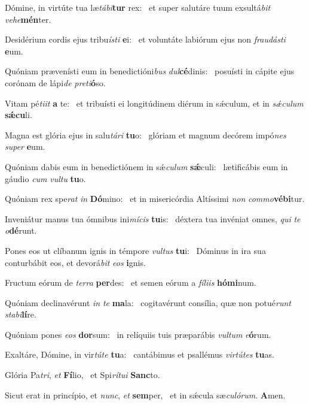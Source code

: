 \item Dómine, in virtúte tua læ\textit{tábi}\textbf{tur} rex:~\psstar{} et super salutáre tuum exsultá\textit{bit} \textit{vehe}\textbf{mén}ter.
\item Desidérium cordis ejus tribu\textit{ísti} \textbf{e}i:~\psstar{} et voluntáte labiórum ejus non \textit{fraudásti} \textbf{e}um.
\item Quóniam prævenísti eum in benedictióni\textit{bus} \textit{dul}\textbf{cé}dinis:~\psstar{} posuísti in cápite ejus corónam de lápi\textit{de} \textit{preti}\textbf{ó}so.
\item Vitam pé\textit{tiit} \textbf{a} te:~\psstar{} et tribuísti ei longitúdinem diérum in sǽculum, et in \textit{sǽculum} \textbf{sǽ}\textbf{cu}li.
\item Magna est glória ejus in salu\textit{tári} \textbf{tu}o:~\psstar{} glóriam et magnum decórem impó\textit{nes} \textit{super} \textbf{e}um.
\item Quóniam dabis eum in benedictiónem in sǽ\textit{culum} \textbf{sǽ}culi:~\psstar{} lætificábis eum in gáudio \textit{cum} \textit{vultu} \textbf{tu}o.
\item Quóniam rex spe\textit{rat} \textit{in} \textbf{Dó}mino:~\psstar{} et in misericórdia Altíssimi \textit{non} \textit{commo}\textbf{vé}\textbf{bi}tur.
\item Inveniátur manus tua ómnibus ini\textit{mícis} \textbf{tu}is:~\psstar{} déxtera tua invéniat omnes, \textit{qui} \textit{te} \textit{o}\textbf{dé}runt.
\item Pones eos ut clíbanum ignis in témpore \textit{vultus} \textbf{tu}i:~\psstar{} Dóminus in ira sua conturbábit eos, et devorá\textit{bit} \textit{eos} \textbf{i}gnis.
\item Fructum eórum de \textit{terra} \textbf{per}des:~\psstar{} et semen eórum a \textit{fíliis} \textbf{hó}\textbf{mi}num.
\item Quóniam declinavérunt \textit{in} \textit{te} \textbf{ma}la:~\psstar{} cogitavérunt consília, quæ non potué\textit{runt} \textit{stabi}\textbf{lí}re.
\item Quóniam pones \textit{eos} \textbf{dor}sum:~\psstar{} in relíquiis tuis præparábis \textit{vultum} \textit{e}\textbf{ó}rum.
\item Exaltáre, Dómine, in vir\textit{túte} \textbf{tu}a:~\psstar{} cantábimus et psallémus \textit{virtútes} \textbf{tu}as.
\item Glória Pa\textit{tri}, \textit{et} \textbf{Fí}lio,~\psstar{} et Spi\textit{rítui} \textbf{Sanc}to.
\item Sicut erat in princípio, et \textit{nunc}, \textit{et} \textbf{sem}per,~\psstar{} et in sǽcula sæ\textit{culórum}. \textbf{A}men.

